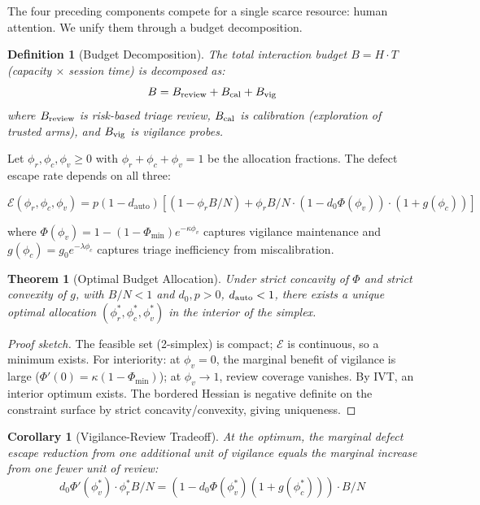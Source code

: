 \documentclass[11pt, a4paper, copyright]{googledeepmind}
\newtheorem{definition}{Definition}[section]
\newtheorem{theorem}{Theorem}[section]
\newtheorem{corollary}{Corollary}[section]
\begin{document}
The four preceding components compete for a single scarce resource: human attention. We unify them through a budget decomposition.

\begin{definition}[Budget Decomposition]
\label{def:budget}
The total interaction budget $B = H \cdot T$ (capacity $\times$ session time) is decomposed as:
\begin{equation}
B = B_{\textup{review}} + B_{\textup{cal}} + B_{\textup{vig}}
\end{equation}
where $B_{\textup{review}}$ is risk-based triage review, $B_{\textup{cal}}$ is calibration (exploration of trusted arms), and $B_{\textup{vig}}$ is vigilance probes.
\end{definition}

Let $\phi_r, \phi_c, \phi_v \geq 0$ with $\phi_r + \phi_c + \phi_v = 1$ be the allocation fractions. The defect escape rate depends on all three:

\begin{equation}
\mathcal{E}(\phi_r, \phi_c, \phi_v) = p(1 - d_{\text{auto}}) \left[(1 - \phi_r B/N) + \phi_r B/N \cdot (1 - d_0 \Phi(\phi_v)) \cdot (1 + g(\phi_c))\right]
\end{equation}

where $\Phi(\phi_v) = 1 - (1 - \Phi_{\min}) e^{-\kappa \phi_v}$ captures vigilance maintenance and $g(\phi_c) = g_0 e^{-\lambda \phi_c}$ captures triage inefficiency from miscalibration.

\begin{theorem}[Optimal Budget Allocation]
\label{thm:budget-optimal}
Under strict concavity of $\Phi$ and strict convexity of $g$, with $B/N < 1$ and $d_0, p > 0$, $d_{\textup{auto}} < 1$, there exists a unique optimal allocation $(\phi_r^*, \phi_c^*, \phi_v^*)$ in the interior of the simplex.
\end{theorem}

\begin{proof}[Proof sketch]
The feasible set (2-simplex) is compact; $\mathcal{E}$ is continuous, so a minimum exists. For interiority: at $\phi_v = 0$, the marginal benefit of vigilance is large ($\Phi'(0) = \kappa(1 - \Phi_{\min})$); at $\phi_v \to 1$, review coverage vanishes. By IVT, an interior optimum exists. The bordered Hessian is negative definite on the constraint surface by strict concavity/convexity, giving uniqueness.
\end{proof}

\begin{corollary}[Vigilance-Review Tradeoff]
\label{cor:tradeoff}
At the optimum, the marginal defect escape reduction from one additional unit of vigilance equals the marginal increase from one fewer unit of review:
\begin{equation}
d_0 \Phi'(\phi_v^*) \cdot \phi_r^* B/N = (1 - d_0 \Phi(\phi_v^*)(1 + g(\phi_c^*))) \cdot B/N
\end{equation}
\end{corollary}
\end{document}
